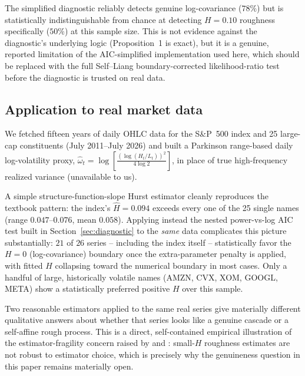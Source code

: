 \documentclass[11pt]{article}
\begin{document}
\begin{finding}
The simplified diagnostic reliably detects genuine log-covariance ($78\%$) but is statistically indistinguishable from chance at detecting $H=0.10$ roughness specifically ($50\%$) at this sample size. This is not evidence against the diagnostic's underlying logic (Proposition~1 is exact), but it is a genuine, reported limitation of the AIC-simplified implementation used here, which should be replaced with the full Self--Liang boundary-corrected likelihood-ratio test before the diagnostic is trusted on real data.
\end{finding}

\subsection{Application to real market data}

We fetched fifteen years of daily OHLC data for the S\&P~500 index and 25 large-cap constituents (July 2011--July 2026) and built a Parkinson range-based daily log-volatility proxy, $\hat\omega_t = \log\!\left[\frac{(\log(H_t/L_t))^2}{4\log2}\right]$, in place of true high-frequency realized variance (unavailable to us).

A simple structure-function-slope Hurst estimator cleanly reproduces the textbook pattern: the index's $\hat H = 0.094$ exceeds every one of the 25 single names (range $0.047$--$0.076$, mean $0.058$). Applying instead the nested power-vs-log AIC test built in Section~\ref{sec:diagnostic} to the \emph{same} data complicates this picture substantially: $21$ of $26$ series -- including the index itself -- statistically favor the $H=0$ (log-covariance) boundary once the extra-parameter penalty is applied, with fitted $H$ collapsing toward the numerical boundary in most cases. Only a handful of large, historically volatile names (AMZN, CVX, XOM, GOOGL, META) show a statistically preferred positive $H$ over this sample.

\begin{finding}
Two reasonable estimators applied to the same real series give materially different qualitative answers about whether that series looks like a genuine cascade or a self-affine rough process. This is a direct, self-contained empirical illustration of the estimator-fragility concern raised by \citet{fukasawa2022rough} and \citet{lebaron2001stochastic}: small-$H$ roughness estimates are not robust to estimator choice, which is precisely why the genuineness question in this paper remains materially open.
\end{finding}
\end{document}
